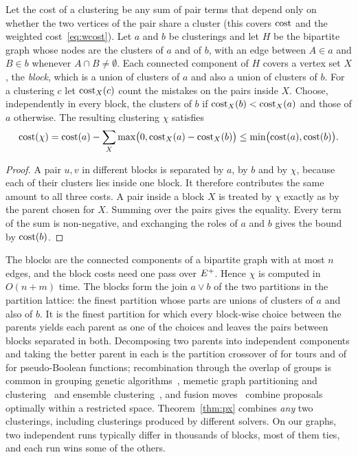 \begin{theorem}\label{thm:px}
Let the cost of a clustering be any sum of pair terms that depend only on
whether the two vertices of the pair share a cluster (this covers $\mathrm{cost}$ and
the weighted cost~\eqref{eq:wcost}).  Let $a$ and $b$ be clusterings and let
$H$ be the bipartite graph whose nodes
are the clusters of $a$ and of $b$, with an edge between $A\in a$ and $B\in b$
whenever $A\cap B\ne\emptyset$.  Each connected component of $H$ covers a
vertex set $X$, the \emph{block}, which is a union of clusters of $a$ and also
a union of clusters of $b$.  For a clustering $c$ let $\mathrm{cost}_X(c)$ count the
mistakes on the pairs inside $X$.  Choose, independently in every block, the
clusters of $b$ if $\mathrm{cost}_X(b)<\mathrm{cost}_X(a)$ and those of $a$ otherwise.  The
resulting clustering $\chi$ satisfies
\[
\mathrm{cost}(\chi)=\mathrm{cost}(a)-\sum_X\max\bigl(0,\mathrm{cost}_X(a)-\mathrm{cost}_X(b)\bigr)
\le\min\bigl(\mathrm{cost}(a),\mathrm{cost}(b)\bigr).
\]
\end{theorem}
\begin{proof}
A pair $u,v$ in different blocks is separated by $a$, by $b$ and by $\chi$,
because each of their clusters lies inside one block.  It therefore
contributes the same amount to all three costs.  A pair inside a block $X$ is
treated by $\chi$ exactly as by the parent chosen for $X$.  Summing over the
pairs gives the equality.  Every term of the sum is non-negative, and
exchanging the roles of $a$ and $b$ gives the bound by $\mathrm{cost}(b)$.
\end{proof}

The blocks are the connected components of a bipartite graph with at most $n$
edges, and the block costs need one pass over $E^{+}$.  Hence $\chi$ is computed in
$O(n+m)$ time.  The blocks form the join $a\vee b$ of the two partitions in the partition
lattice: the finest partition whose parts are unions of clusters of $a$ and
also of $b$.  It is the finest partition for which every block-wise choice
between the parents yields each parent as one of the choices and leaves the
pairs between blocks separated in both.  Decomposing two parents into independent components and taking the better
parent in each is the partition crossover of
\citet{WhitleyHH09gpx,WhitleyHH10hybrid,TinosWO20gpx2} for tours and of
\citet{TinosWC15px} for pseudo-Boolean functions; recombination through the
overlap of groups is common in grouping genetic
algorithms~\citep{Falkenauer98grouping,GalinierH99coloring}, memetic graph
partitioning and clustering~\citep{SandersS12kaffpae,BiedermannHSS18memetic}
and ensemble clustering~\citep{OvelgonneG13ensemble}, and fusion
moves~\citep{BeierHK15fusion} combine proposals optimally within a restricted
space.  Theorem~\ref{thm:px} combines \emph{any} two clusterings, including
clusterings produced by different solvers.  On our graphs, two independent runs typically differ in thousands of
blocks, most of them ties, and each run wins some of the others.

